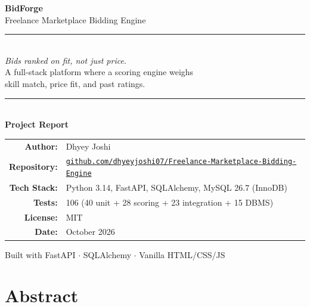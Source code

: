 \documentclass[12pt, a4paper]{report}
\begin{document}
\begin{titlepage}
  \centering
  \vspace*{2cm}

  {\Huge\bfseries\color{sectioncolor} BidForge}\\[0.5cm]
  {\LARGE Freelance Marketplace Bidding Engine}\\[1.5cm]

  \rule{\textwidth}{1pt}\\[0.5cm]
  {\Large\textit{Bids ranked on fit, not just price.}}\\[0.3cm]
  {\large A full-stack platform where a scoring engine weighs\\skill match, price fit, and past ratings.}\\[0.5cm]
  \rule{\textwidth}{1pt}\\[2cm]

  {\Large\textbf{Project Report}}\\[1.5cm]

  \begin{tabular}{rl}
    \textbf{Author:}      & Dhyey Joshi \\[0.3cm]
    \textbf{Repository:}   & \href{https://github.com/dhyeyjoshi07/Freelance-Marketplace-Bidding-Engine}{\texttt{github.com/dhyeyjoshi07/Freelance-Marketplace-Bidding-Engine}} \\[0.3cm]
    \textbf{Tech Stack:}   & Python 3.14, FastAPI, SQLAlchemy, MySQL 26.7 (InnoDB) \\[0.3cm]
    \textbf{Tests:}        & 106 (40 unit + 28 scoring + 23 integration + 15 DBMS) \\[0.3cm]
    \textbf{License:}      & MIT \\[0.3cm]
    \textbf{Date:}         & October 2026 \\
  \end{tabular}

  \vfill
  {\small Built with FastAPI \(\cdot\) SQLAlchemy \(\cdot\) Vanilla HTML/CSS/JS}
\end{titlepage}

\tableofcontents
\newpage

\chapter{Abstract}
\end{document}
